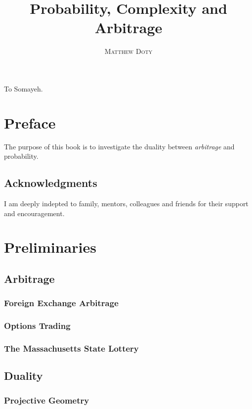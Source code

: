 \documentclass[a4paper,11pt]{book}
\title{\Huge \textbf{Probability, Complexity and Arbitrage}}
\author{\textsc{Matthew Doty}}
\date{}
\newenvironment{dedication}
{
   \cleardoublepage
   \thispagestyle{empty}
   \vspace*{\stretch{1}}
   \hfill\begin{minipage}[t]{0.66\textwidth}
   \raggedright
}
{
   \end{minipage}
   \vspace*{\stretch{3}}
   \clearpage
}
\begin{document}
\frontmatter
\maketitle

\begin{dedication}
To Somayeh.
\end{dedication}


\tableofcontents

\mainmatter

\chapter*{Preface}
The purpose of this book is to investigate the duality between \emph{arbitrage}
and probability.

\section*{Acknowledgments}
I am deeply indepted to family, mentors, colleagues and friends for their support and encouragement.

\chapter{Preliminaries}
\section{Arbitrage}
\subsection{Foreign Exchange Arbitrage}
\subsection{Options Trading}
\subsection{The Massachusetts State Lottery}
\section{Duality}
\subsection{Projective Geometry}
\end{document}
